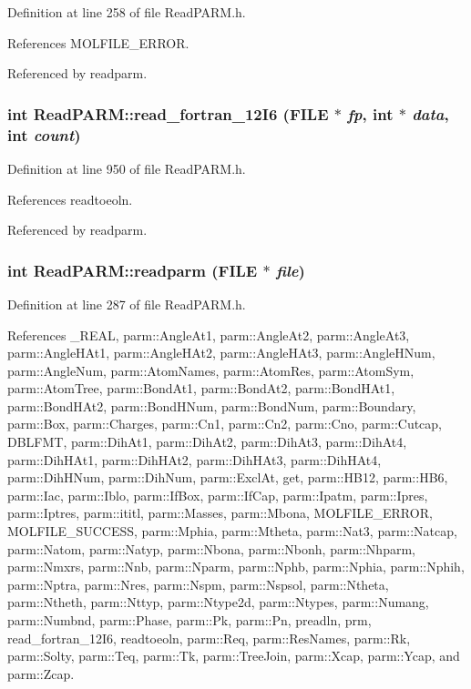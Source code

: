 Definition at line 258 of file Read\-PARM.h.

References MOLFILE\_\-ERROR.

Referenced by readparm.
\subsubsection{\setlength{\rightskip}{0pt plus 5cm}int Read\-PARM::read\_\-fortran\_\-12I6 (FILE $\ast$ {\em fp}, int $\ast$ {\em data}, int {\em count})}\label{classReadPARM_a13}




Definition at line 950 of file Read\-PARM.h.

References readtoeoln.

Referenced by readparm.
\subsubsection{\setlength{\rightskip}{0pt plus 5cm}int Read\-PARM::readparm (FILE $\ast$ {\em file})}\label{classReadPARM_a6}




Definition at line 287 of file Read\-PARM.h.

References \_\-REAL, parm::Angle\-At1, parm::Angle\-At2, parm::Angle\-At3, parm::Angle\-HAt1, parm::Angle\-HAt2, parm::Angle\-HAt3, parm::Angle\-HNum, parm::Angle\-Num, parm::Atom\-Names, parm::Atom\-Res, parm::Atom\-Sym, parm::Atom\-Tree, parm::Bond\-At1, parm::Bond\-At2, parm::Bond\-HAt1, parm::Bond\-HAt2, parm::Bond\-HNum, parm::Bond\-Num, parm::Boundary, parm::Box, parm::Charges, parm::Cn1, parm::Cn2, parm::Cno, parm::Cutcap, DBLFMT, parm::Dih\-At1, parm::Dih\-At2, parm::Dih\-At3, parm::Dih\-At4, parm::Dih\-HAt1, parm::Dih\-HAt2, parm::Dih\-HAt3, parm::Dih\-HAt4, parm::Dih\-HNum, parm::Dih\-Num, parm::Excl\-At, get, parm::HB12, parm::HB6, parm::Iac, parm::Iblo, parm::If\-Box, parm::If\-Cap, parm::Ipatm, parm::Ipres, parm::Iptres, parm::ititl, parm::Masses, parm::Mbona, MOLFILE\_\-ERROR, MOLFILE\_\-SUCCESS, parm::Mphia, parm::Mtheta, parm::Nat3, parm::Natcap, parm::Natom, parm::Natyp, parm::Nbona, parm::Nbonh, parm::Nhparm, parm::Nmxrs, parm::Nnb, parm::Nparm, parm::Nphb, parm::Nphia, parm::Nphih, parm::Nptra, parm::Nres, parm::Nspm, parm::Nspsol, parm::Ntheta, parm::Ntheth, parm::Nttyp, parm::Ntype2d, parm::Ntypes, parm::Numang, parm::Numbnd, parm::Phase, parm::Pk, parm::Pn, preadln, prm, read\_\-fortran\_\-12I6, readtoeoln, parm::Req, parm::Res\-Names, parm::Rk, parm::Solty, parm::Teq, parm::Tk, parm::Tree\-Join, parm::Xcap, parm::Ycap, and parm::Zcap.

